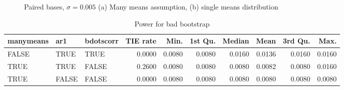 \documentclass{article}
\begin{document}
\begin{figure}[H]
    \centering
    \caption{Paired bases, $\sigma = 0.005$ (a) Many means assumption, (b) single means distribution }
\label{fig:pair_low_sig_dist_plots}
\end{figure}

\begin{table}[ht]
\centering
\begin{tabular}{lllrrrrrrr}
  \hline
manymeans & ar1 & bdotscorr & TIE rate & Min. & 1st Qu. & Median & Mean & 3rd Qu. & Max. \\ 
  \hline
FALSE & TRUE & TRUE & 0.0000 & 0.0080 & 0.0080 & 0.0160 & 0.0136 & 0.0160 & 0.0160 \\ 
  TRUE & TRUE & FALSE & 0.2600 & 0.0080 & 0.0080 & 0.0080 & 0.0082 & 0.0080 & 0.0160 \\ 
  TRUE & FALSE & FALSE & 0.0000 & 0.0080 & 0.0080 & 0.0080 & 0.0080 & 0.0080 & 0.0080 \\ 
   \hline
\end{tabular}
\caption{Power for bad bootstrap} 
\label{tab:bad_boot_pwr2}
\end{table}
\end{document}
